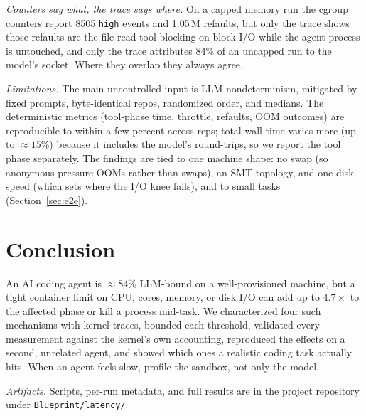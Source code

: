 \documentclass[10pt,twocolumn]{article}
\begin{document}
\emph{Counters say what, the trace says where.} On a capped memory run the
cgroup counters report 8505 \texttt{high} events and 1.05\,M refaults, but
only the trace shows those refaults are the file-read tool blocking on block
I/O while the agent process is untouched, and only the trace attributes 84\%
of an uncapped run to the model's socket. Where they overlap they always agree.

\emph{Limitations.} The main uncontrolled input is LLM nondeterminism,
mitigated by fixed prompts, byte-identical repos, randomized order, and
medians. The deterministic metrics (tool-phase time, throttle, refaults, OOM
outcomes) are reproducible to within a few percent across reps; total wall
time varies more (up to ${\approx}15\%$) because it includes the model's
round-trips, so we report the tool phase separately. The findings
are tied to one machine shape: no swap (so anonymous pressure OOMs rather
than swaps), an SMT topology, and one disk speed (which sets where the I/O
knee falls), and to small tasks (Section~\ref{sec:e2e}).

\section{Conclusion}

An AI coding agent is ${\approx}84\%$ LLM-bound on a well-provisioned
machine, but a tight container limit on CPU, cores, memory, or disk I/O can
add up to $4.7\times$ to the affected phase or kill a process mid-task. We
characterized four such mechanisms with kernel traces, bounded each
threshold, validated every measurement against the kernel's own accounting,
reproduced the effects on a second, unrelated agent, and showed which ones a
realistic coding task actually hits. When an agent feels slow, profile the
sandbox, not only the model.

\emph{Artifacts.} Scripts, per-run metadata, and full results are in the
project repository under \texttt{Blueprint/latency/}.
\end{document}
